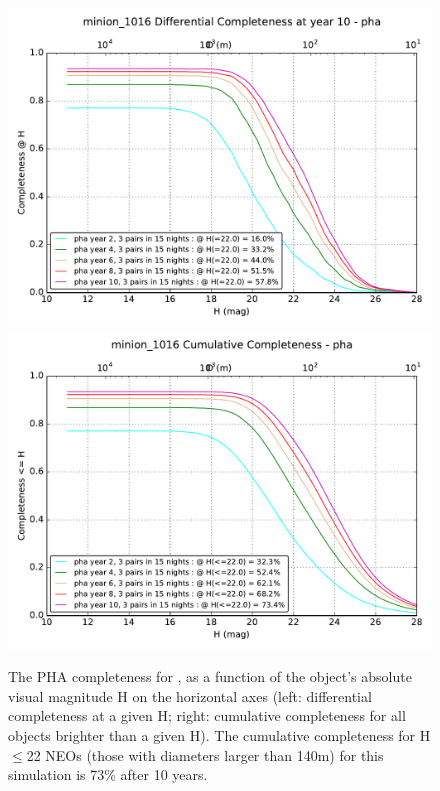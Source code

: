 \begin{figure}[th]
\includegraphics[angle=0,width=0.49\hsize:,clip]{figs/solarsystem/minion_1016_Completeness_2_10_8_6_4_pha_year_3_pairs_in_15_nights_MOOB_ComboMetricVsH}
\includegraphics[angle=0,width=0.49\hsize:,clip]{figs/solarsystem/minion_1016_CumulativeCompleteness_2_10_8_6_4_pha_year_3_pairs_in_15_nights_MOOB_ComboMetricVsH}
\caption{The PHA completeness for , as a function of the object's absolute
visual magnitude H on the horizontal axes (left: differential completeness at a given H;
right: cumulative completeness for all objects brighter than a given H).
The cumulative completeness for H$\le$22 NEOs (those with diameters larger than 140m)  for this
simulation is 73\% after 10 years.}
\label{fig:baselinePHA}
\end{figure}

